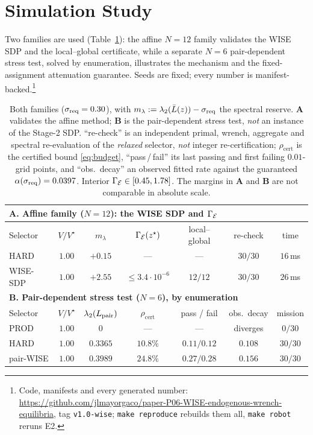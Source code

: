 \section{Simulation Study}
\label{sec:exp}

Two families are used (Table~\ref{tab:glance}): the affine $N{=}12$ family validates the WISE
SDP and the local--global certificate, while a separate $N{=}6$ pair-dependent stress test,
solved by enumeration, illustrates the mechanism and the fixed-assignment attenuation
guarantee. Seeds are fixed; every number is manifest-backed.\footnote{Code, manifests and every generated number:
\url{https://github.com/jlmayorgaco/paper-P06-WISE-endogenous-wrench-equilibria}, tag
\texttt{v1.0-wise}; \texttt{make reproduce} rebuilds them all, \texttt{make robot} reruns E2.}

\begin{table}[t]\centering\scriptsize
\caption{Both families ($\sigma_{\mathrm{req}}=0.30$), with
$m_\lambda:=\lambda_2(\bar L(z))-\sigma_{\mathrm{req}}$ the spectral reserve. \textbf{A} validates the affine
method;
\textbf{B} is the pair-dependent stress test, \emph{not} an instance of the Stage-2 SDP.
``re-check'' is an independent primal, wrench, aggregate and spectral re-evaluation of the
\emph{relaxed} selector, \emph{not} integer re-certification; $\rho_{\mathrm{cert}}$ is the
certified bound \eqref{eq:budget}, ``pass\,/\,fail'' its last passing and first failing
$0.01$-grid points, and ``obs.\ decay'' an observed fitted rate against the guaranteed
$\alpha(\sigma_{\mathrm{req}})=0.0397$. Interior $\Gamma_{\mathcal{E}}\in[0.45,1.78]$. The margins in
\textbf{A} and \textbf{B} are not comparable in absolute scale.}
\label{tab:glance}
\setlength{\tabcolsep}{3pt}
\begin{tabular}{lcccccc}
\hline
\multicolumn{7}{l}{\textbf{A. Affine family ($N{=}12$): the WISE SDP and $\Gamma_{\mathcal{E}}$}}\\
\hline
Selector & $V/V^{\star}$ & $m_\lambda$ & $\Gamma_{\mathcal{E}}(z^{\star})$ &
local--global & re-check & time\\
HARD & $1.00$ & $+0.15$ & --- & --- & $30/30$ & $16$\,ms\\
WISE-SDP & $1.00$ & $\mathbf{+2.55}$ & $\le3.4\cdot10^{-6}$ & $12/12$ & $30/30$ & $26$\,ms\\
\hline
\multicolumn{7}{l}{\textbf{B. Pair-dependent stress test ($N{=}6$), by enumeration}}\\
\hline
Selector & $V/V^{\star}$ & $\lambda_2(L_{\mathrm{pair}})$ & $\rho_{\mathrm{cert}}$ &
pass / fail & obs.\ decay & mission\\
PROD & $1.00$ & $0$ & --- & --- & diverges & $0/30$\\
HARD & $1.00$ & $0.3365$ & $10.8\%$ & $0.11/0.12$ & $0.108$ & $30/30$\\
pair-WISE & $1.00$ & $0.3989$ & $24.8\%$ & $0.27/0.28$ & $0.156$ & $30/30$\\
\hline
\end{tabular}
\end{table}


